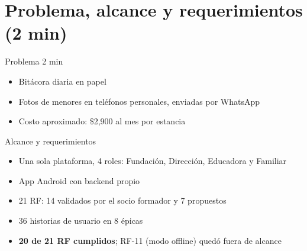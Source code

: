 \section{Problema, alcance y requerimientos (2 min)}

\begin{frame}{Problema \hfill\small 2 min}
  \Large
  \begin{itemize}
    \item Bitácora diaria en papel
    \item Fotos de menores en teléfonos personales, enviadas por WhatsApp
    \item Costo aproximado: \$2,900 al mes por estancia
  \end{itemize}
\end{frame}

\begin{frame}{Alcance y requerimientos}
  \large
  \begin{itemize}
    \item Una sola plataforma, 4 roles: Fundación, Dirección, Educadora y Familiar
    \item App Android con backend propio
    \item 21 RF: 14 validados por el socio formador y 7 propuestos
    \item 36 historias de usuario en 8 épicas
    \item \textbf{20 de 21 RF cumplidos}; RF-11 (modo offline) quedó fuera de alcance
  \end{itemize}
\end{frame}
